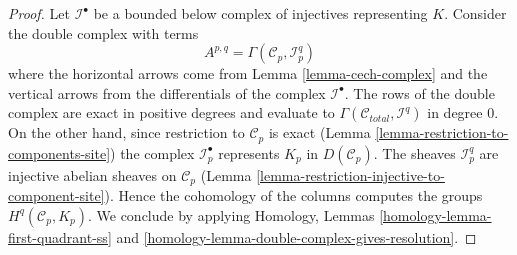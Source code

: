 \documentclass{stacks-project}
\theoremstyle{plain}
\theoremstyle{definition}
\theoremstyle{remark}
\numberwithin{equation}{subsection}
\begin{document}
\begin{proof}
Let $\mathcal{I}^\bullet$ be a bounded below complex of injectives
representing $K$. Consider the double complex with terms
$$
A^{p, q} = \Gamma(\mathcal{C}_p, \mathcal{I}^q_p)
$$
where the horizontal arrows come from Lemma \ref{lemma-cech-complex}
and the vertical arrows from the differentials of the
complex $\mathcal{I}^\bullet$. The rows of the double complex are exact
in positive degrees and evaluate to
$\Gamma(\mathcal{C}_{total}, \mathcal{I}^q)$ in degree $0$.
On the other hand, since restriction to $\mathcal{C}_p$ is exact
(Lemma \ref{lemma-restriction-to-components-site})
the complex $\mathcal{I}_p^\bullet$ represents $K_p$ in
$D(\mathcal{C}_p)$. The sheaves $\mathcal{I}_p^q$ are injective
abelian sheaves on $\mathcal{C}_p$
(Lemma \ref{lemma-restriction-injective-to-component-site}).
Hence the cohomology of the columns computes the groups
$H^q(\mathcal{C}_p, K_p)$. We conclude by applying
Homology, Lemmas \ref{homology-lemma-first-quadrant-ss} and
\ref{homology-lemma-double-complex-gives-resolution}.
\end{proof}
\end{document}
